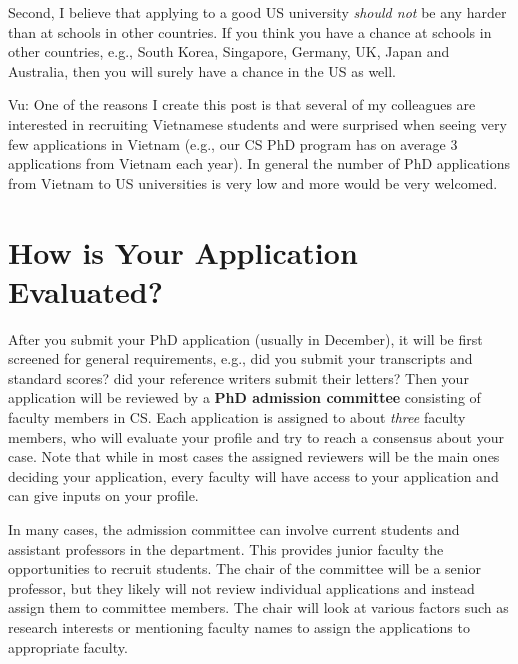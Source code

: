 \documentclass[11pt]{article}
\begin{document}
Second, I believe that applying to a good US university \emph{should not} be any
harder than at schools in other countries. If you think you have a
chance at schools in other countries, e.g., South Korea, Singapore, Germany, UK, Japan and Australia, then you will surely have a chance in the US as well.

\begin{tcolorbox}[left=1pt,right=1pt,top=1pt,bottom=1pt]
Vu: One of the reasons I create this post is that several of my colleagues are interested in 
recruiting Vietnamese students and were surprised when seeing very few applications in Vietnam (e.g., our CS PhD program has on average 3 applications from Vietnam each year). In general the number of
PhD applications from Vietnam to US universities is very low and  more would be very welcomed. 
\end{tcolorbox}



\section{How is Your Application Evaluated?}

After you submit your PhD application (usually in December), it will be first screened
for general requirements, e.g., did you submit your transcripts and standard scores? did your reference writers submit their letters?
Then your application will be reviewed by a
\textbf{PhD admission committee} consisting of faculty members in CS. Each application is assigned to about \emph{three} faculty members, who will evaluate your profile and try to reach a consensus about your case.  Note that while in most cases the assigned reviewers will be the main ones deciding your application, every faculty will have access to your application and can give inputs on your profile.

In many cases, the admission committee can involve current students and assistant professors in the department. This provides junior faculty the opportunities to recruit students. The chair of the committee will be a senior professor, but they likely will not review individual applications and instead assign them to committee members. The chair will look at various factors such as research interests or mentioning faculty names to assign the applications to appropriate faculty. 
\end{document}

